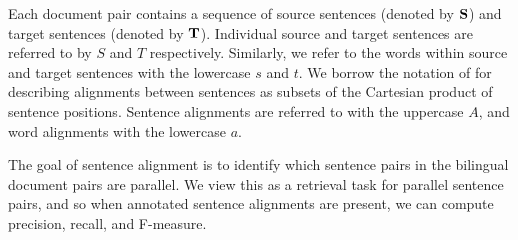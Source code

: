 {Each document pair contains a sequence of source sentences (denoted by ${\bf
S}$) and target sentences (denoted by ${\bf T}$). Individual source and target
sentences are referred to by $S$ and $T$ respectively. Similarly, we refer to
the words within source and target sentences with the lowercase $s$ and $t$. We
borrow the notation of \citep{Och03} for describing alignments between sentences
as subsets of the Cartesian product of sentence positions. Sentence alignments
are referred to with the uppercase $A$, and word alignments with the lowercase
$a$.

The goal of sentence alignment is to identify which sentence pairs in the
bilingual document pairs are parallel. We view this as a retrieval task for
parallel sentence pairs, and so when annotated sentence alignments are present,
we can compute precision, recall, and F-measure.
}
